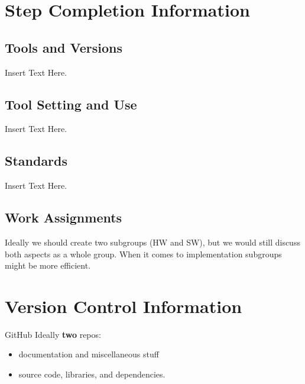 \documentclass [12pt]{article}
\begin{document}
\section{Step Completion Information}

\subsection{Tools and Versions}
Insert Text Here.

\subsection{Tool Setting and Use}
Insert Text Here.


\subsection{Standards}
Insert Text Here. 

\subsection{Work Assignments}

Ideally we should create two subgroups (HW and SW), but we would still
discuss both aspects as a whole group. When it comes to implementation subgroups might be more efficient.






\section{Version Control Information}

GitHub
Ideally \textbf{two} repos: 
\begin{itemize} 
\item  documentation and miscellaneous stuff
\item  source code, libraries, and dependencies.
\end{itemize}
\end{document}
